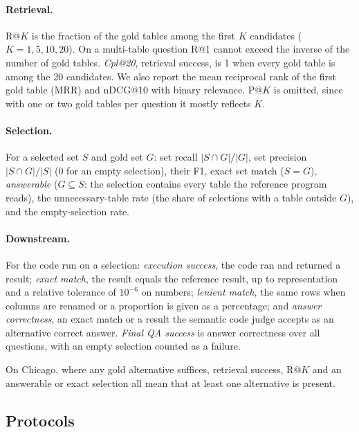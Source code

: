 \paragraph{Retrieval.}
R@$K$ is the fraction of the gold tables among the first $K$ candidates
($K=1,5,10,20$). On a multi-table question R@1 cannot exceed the inverse of
the number of gold tables. \emph{Cpl@20}, retrieval success, is 1 when every
gold table is among the 20 candidates. We also report the mean reciprocal rank
of the first gold table (MRR) and nDCG@10 with binary relevance. P@$K$ is
omitted, since with one or two gold tables per question it mostly reflects
$K$.

\paragraph{Selection.}
For a selected set $S$ and gold set $G$: set recall $|S\cap G|/|G|$, set
precision $|S\cap G|/|S|$ (0 for an empty selection), their F1, exact set
match ($S=G$), \emph{answerable} ($G \subseteq S$: the selection contains every
table the reference program reads), the unnecessary-table rate (the share of
selections with a table outside $G$), and the empty-selection rate.

\paragraph{Downstream.}
For the code run on a selection: \emph{execution success}, the code ran and
returned a result; \emph{exact match}, the result equals the reference result,
up to representation and a relative tolerance of $10^{-6}$ on numbers;
\emph{lenient match}, the same rows when columns are renamed or a proportion is
given as a percentage; and \emph{answer correctness}, an exact match or a
result the semantic code judge accepts as an alternative correct answer.
\emph{Final QA success} is answer correctness over all questions, with an
empty selection counted as a failure.

On Chicago, where any gold alternative suffices, retrieval success, R@$K$ and
an answerable or exact selection all mean that at least one alternative is
present.

\subsection{Protocols}
\label{sec:protocols}


